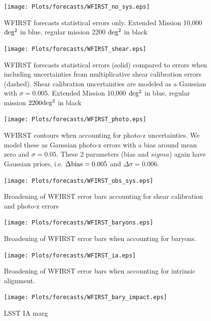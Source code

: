 \begin{figure}
\texttt{[image: Plots/forecasts/WFIRST\_no\_sys.eps]}
\caption{WFIRST forecasts statistical errors only. Extended Mission 10,000 $\mathrm{deg^2}$ in blue, regular mission 2200 $\mathrm{deg^2}$ in black}
         \label{fi:lsst1}
\end{figure}

\begin{figure}
\texttt{[image: Plots/forecasts/WFIRST\_shear.eps]}
\caption{WFIRST forecasts statistical errors (solid) compared to errors when including uncertainties from multiplicative shear calibration errors (dashed). Shear calibration uncertainties are modeled as a Gaussian with $\sigma=0.005$. Extended Mission 10,000 $\mathrm{deg^2}$ in blue, regular mission $2200 \mathrm{deg^2}$ in black}
         \label{fi:lsst1}
\end{figure}

\begin{figure}
\texttt{[image: Plots/forecasts/WFIRST\_photo.eps]}
\caption{WFIRST contours when accounting for photo-z uncertainties. We model these as Gaussian photo-z errors with a bias around mean zero and $\sigma=0.05$. These 2 parameters (bias and $sigma$) again have Gaussian priors, i.e. $\Delta \mathrm{bias}=0.005$ and $\Delta \sigma=0.006$.}
         \label{fi:lsst1}
\end{figure}

\begin{figure}
\texttt{[image: Plots/forecasts/WFIRST\_obs\_sys.eps]}
\caption{Broadening of WFIRST error bars accounting for shear calibration and photo-z errors}
         \label{fi:lsst1}
\end{figure}

\begin{figure}
\texttt{[image: Plots/forecasts/WFIRST\_baryons.eps]}
\caption{Broadening of WFIRST error bars when accounting for baryons.}
         \label{fi:lsst1}
\end{figure}

\begin{figure}
\texttt{[image: Plots/forecasts/WFIRST\_ia.eps]}
\caption{Broadening of WFIRST error bars when accounting for intrinsic alignment.}
         \label{fi:lsst1}
\end{figure}



\begin{figure}
\texttt{[image: Plots/forecasts/WFIRST\_bary\_impact.eps]}
\caption{LSST IA marg}
         \label{fi:lsst1}
\end{figure}

